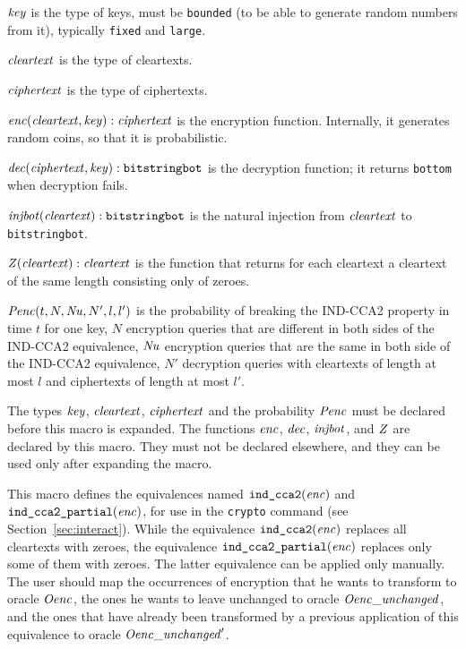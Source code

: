 \documentclass{article}
\begin{document}
\begin{itemize}
   $\mathit{key}$ is the type of keys, must be \texttt{bounded} (to be able to generate random numbers from it), typically \texttt{fixed} and \texttt{large}.

   $\mathit{cleartext}$ is the type of cleartexts.

   $\mathit{ciphertext}$ is the type of ciphertexts.

   $\mathit{enc}(\mathit{cleartext}, \mathit{key}): \mathit{ciphertext}$ is the encryption function. Internally, it generates random coins, so that it is probabilistic.

   $\mathit{dec}(\mathit{ciphertext}, \mathit{key}): \texttt{bitstringbot}$ is the
  decryption function; it returns \texttt{bottom} when decryption
  fails.

   $\mathit{injbot}(\mathit{cleartext}): \texttt{bitstringbot}$ is the natural
  injection from $\mathit{cleartext}$ to \texttt{bitstringbot}.

   $\mathit{Z}(\mathit{cleartext}): \mathit{cleartext}$ is the function that
  returns for each cleartext a cleartext of the same length consisting
  only of zeroes.

  $\mathit{Penc}(t, N, \mathit{Nu}, N', l, l')$ is the probability of breaking the
  IND-CCA2 property in time $t$ for one key, $N$ encryption queries that are 
  different in both sides of the IND-CCA2 equivalence, 
  $\mathit{Nu}$ encryption queries that are the same in both side of the IND-CCA2 equivalence, $N'$
  decryption queries with cleartexts of length at most $l$ and
  ciphertexts of length at most $l'$.

   The types $\mathit{key}$, $\mathit{cleartext}$,
   $\mathit{ciphertext}$ and the probability $\mathit{Penc}$ must
   be declared before this macro is expanded. The functions
   $\mathit{enc}$, $\mathit{dec}$, $\mathit{injbot}$, and $\mathit{Z}$ are declared by this
   macro. They must not be declared elsewhere, and they can be used
   only after expanding the macro.

   This macro defines the equivalences named
   $\texttt{ind\_cca2}(\mathit{enc})$ and
   $\texttt{ind\_cca2\_partial}(\mathit{enc})$, for use in the
   \texttt{crypto} command (see Section~\ref{sec:interact}). While the
   equivalence $\texttt{ind\_cca2}(\mathit{enc})$ replaces all cleartexts
   with zeroes, the equivalence
   $\texttt{ind\_cca2\_partial}(\mathit{enc})$ replaces only some of them
   with zeroes. The latter equivalence can be applied only manually.
   The user should map the occurrences of encryption that he wants to
   transform to oracle $\mathit{Oenc}$, the ones he wants to leave unchanged to
   oracle $\mathit{Oenc\_unchanged}$, and the ones that have already been transformed
   by a previous application of this equivalence to oracle $\mathit{Oenc\_unchanged}'$.


\end{itemize}
\end{document}
